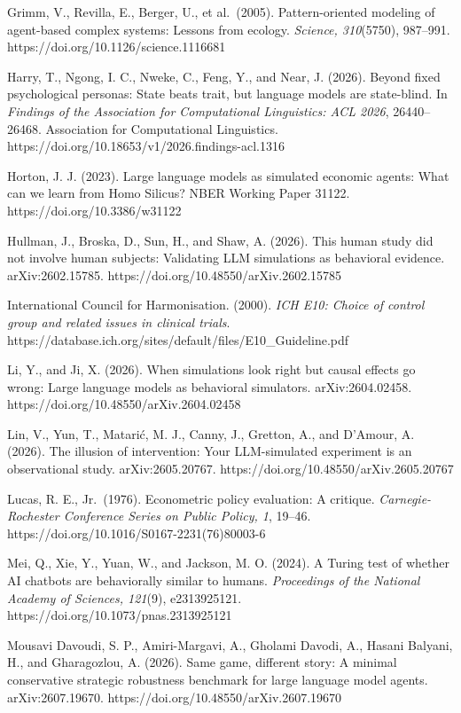 \documentclass[
  11pt]{article}
\begin{document}
Grimm, V., Revilla, E., Berger, U., et al.~(2005). Pattern-oriented
modeling of agent-based complex systems: Lessons from ecology.
\emph{Science, 310}(5750), 987--991.
https://doi.org/10.1126/science.1116681

Harry, T., Ngong, I. C., Nweke, C., Feng, Y., and Near, J. (2026).
Beyond fixed psychological personas: State beats trait, but language
models are state-blind. In \emph{Findings of the Association for
Computational Linguistics: ACL 2026}, 26440--26468. Association for
Computational Linguistics.
https://doi.org/10.18653/v1/2026.findings-acl.1316

Horton, J. J. (2023). Large language models as simulated economic
agents: What can we learn from Homo Silicus? NBER Working Paper 31122.
https://doi.org/10.3386/w31122

Hullman, J., Broska, D., Sun, H., and Shaw, A. (2026). This human study
did not involve human subjects: Validating LLM simulations as behavioral
evidence. arXiv:2602.15785. https://doi.org/10.48550/arXiv.2602.15785

International Council for Harmonisation. (2000). \emph{ICH E10: Choice
of control group and related issues in clinical trials}.
https://database.ich.org/sites/default/files/E10\_Guideline.pdf

Li, Y., and Ji, X. (2026). When simulations look right but causal
effects go wrong: Large language models as behavioral simulators.
arXiv:2604.02458. https://doi.org/10.48550/arXiv.2604.02458

Lin, V., Yun, T., Matarić, M. J., Canny, J., Gretton, A., and D'Amour,
A. (2026). The illusion of intervention: Your LLM-simulated experiment
is an observational study. arXiv:2605.20767.
https://doi.org/10.48550/arXiv.2605.20767

Lucas, R. E., Jr.~(1976). Econometric policy evaluation: A critique.
\emph{Carnegie-Rochester Conference Series on Public Policy, 1}, 19--46.
https://doi.org/10.1016/S0167-2231(76)80003-6

Mei, Q., Xie, Y., Yuan, W., and Jackson, M. O. (2024). A Turing test of
whether AI chatbots are behaviorally similar to humans.
\emph{Proceedings of the National Academy of Sciences, 121}(9),
e2313925121. https://doi.org/10.1073/pnas.2313925121

Mousavi Davoudi, S. P., Amiri-Margavi, A., Gholami Davodi, A., Hasani
Balyani, H., and Gharagozlou, A. (2026). Same game, different story: A
minimal conservative strategic robustness benchmark for large language
model agents. arXiv:2607.19670.
https://doi.org/10.48550/arXiv.2607.19670
\end{document}
